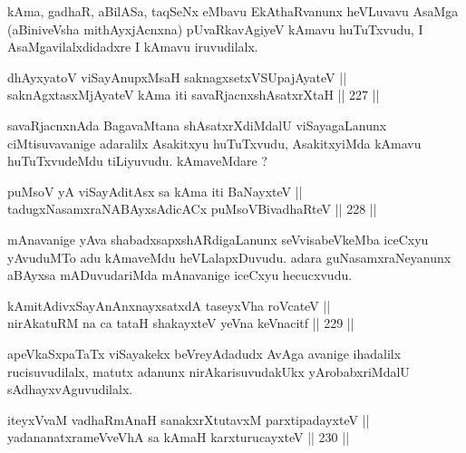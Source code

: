 \begin{artha}
kAma, gadhaR, aBilASa, taqSeNx eMbavu EkAthaRvanunx
heVLuvavu AsaMga (aBiniveVsha mithAyxjAcnxna) pUvaRkavAgiyeV kAmavu
huTuTxvudu, I AsaMgavilalxdidadxre I kAmavu iruvudilalx.
\end{artha}


\begin{shl}
dhAyxyatoV viSayAnupxMsaH saknagxsetxVSUpajAyateV || \\
saknAgxtasxMjAyateV kAma iti savaRjacnxshAsatxrXtaH \hfill || 227 ||  
\end{shl}

\begin{artha}
savaRjacnxnAda BagavaMtana shAsatxrXdiMdalU viSayagaLanunx
ciMtisuvavanige adaralilx Asakitxyu huTuTxvudu, AsakitxyiMda kAmavu
huTuTxvudeMdu tiLiyuvudu. kAmaveMdare ?
\end{artha}

\begin{shl}
puMsoV yA viSayAditAsx sa kAma iti BaNayxteV || \\
tadugxNasamxraNABAyxsAdicACx puMsoV\s BivadhaRteV \hfill || 228 ||  
\end{shl}

\begin{artha}
mAnavanige yAva shabadxsapxshARdigaLanunx seVvisabeVkeMba iceCxyu
yAvuduMTo adu kAmaveMdu heVLalapxDuvudu. adara guNasamxraNeyanunx
aBAyxsa mADuvudariMda mAnavanige iceCxyu hecucxvudu.
\end{artha}

\begin{shl}
kAmitAdivxSayAnAnxnayxsatxdA taseyxVha roVcateV || \\
nirAkatuRM na ca tataH shakayxteV yeVna keVnacitf \hfill || 229 ||  
\end{shl}

\begin{artha}
apeVkaSxpaTaTx viSayakekx beVreyAdadudx AvAga avanige ihadalilx
rucisuvudilalx, matutx adanunx nirAkarisuvudakUkx yArobabxriMdalU
sAdhayxvAguvudilalx.
\end{artha}

\begin{shl}
iteyxVvaM vadhaRmAnaH sana\footnotemark[1]kxrXtutavxM parxtipadayxteV || \\
yadananatxrameVveVhA sa kAmaH karxturucayxteV \hfill || 230 ||  
\end{shl}


